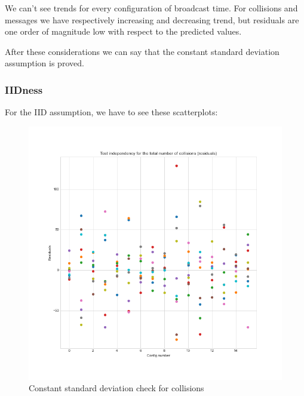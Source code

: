 We can't see trends for every configuration of broadcast time. For collisions
and messages we have respectively increasing and decreasing trend, but residuals
are one order of magnitude low with respect to the predicted values.

After these considerations we can say that the constant standard deviation
assumption is proved.

\subsubsection{IIDness}
For the IID assumption, we have to see these scatterplots:
\begin{figure}
	\centering
	\includegraphics[width=\textwidth]
	{img/lowdensity2kr/assumptions/collisions-independency.png}
	\caption{Constant standard deviation check for
	collisions}\label{fig:system}
\end{figure}

